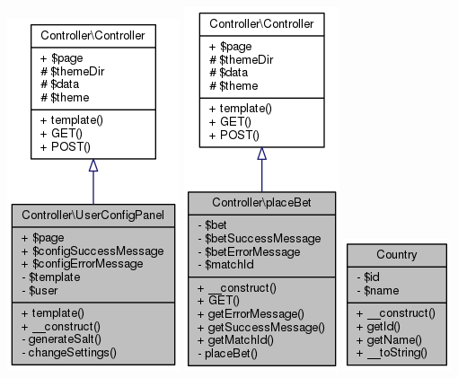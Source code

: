 \documentclass[11pt]{article}
\begin{document}
\includegraphics[scale=0.4]{UML_Controller_1_1UserConfigPanel.png}
\includegraphics[scale=0.4]{UML_Controller_1_1placeBet.png}
\includegraphics[scale=0.4]{UML_Country.png}
\end{document}
